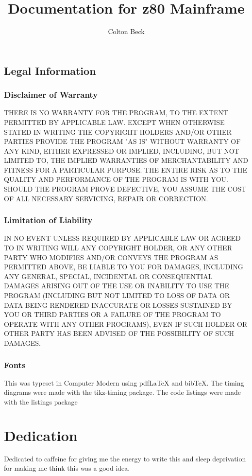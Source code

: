 \documentclass{book}
\begin{document}
\frontmatter
\title{Documentation for z80 Mainframe}
\author{Colton Beck}
\maketitle
\section*{Legal Information}
\subsection*{Disclaimer of Warranty}

  THERE IS NO WARRANTY FOR THE PROGRAM, TO THE EXTENT PERMITTED BY
APPLICABLE LAW.  EXCEPT WHEN OTHERWISE STATED IN WRITING THE COPYRIGHT
HOLDERS AND/OR OTHER PARTIES PROVIDE THE PROGRAM "AS IS" WITHOUT WARRANTY
OF ANY KIND, EITHER EXPRESSED OR IMPLIED, INCLUDING, BUT NOT LIMITED TO,
THE IMPLIED WARRANTIES OF MERCHANTABILITY AND FITNESS FOR A PARTICULAR
PURPOSE.  THE ENTIRE RISK AS TO THE QUALITY AND PERFORMANCE OF THE PROGRAM
IS WITH YOU.  SHOULD THE PROGRAM PROVE DEFECTIVE, YOU ASSUME THE COST OF
ALL NECESSARY SERVICING, REPAIR OR CORRECTION.

\subsection*{Limitation of Liability}

  IN NO EVENT UNLESS REQUIRED BY APPLICABLE LAW OR AGREED TO IN WRITING
WILL ANY COPYRIGHT HOLDER, OR ANY OTHER PARTY WHO MODIFIES AND/OR CONVEYS
THE PROGRAM AS PERMITTED ABOVE, BE LIABLE TO YOU FOR DAMAGES, INCLUDING ANY
GENERAL, SPECIAL, INCIDENTAL OR CONSEQUENTIAL DAMAGES ARISING OUT OF THE
USE OR INABILITY TO USE THE PROGRAM (INCLUDING BUT NOT LIMITED TO LOSS OF
DATA OR DATA BEING RENDERED INACCURATE OR LOSSES SUSTAINED BY YOU OR THIRD
PARTIES OR A FAILURE OF THE PROGRAM TO OPERATE WITH ANY OTHER PROGRAMS),
EVEN IF SUCH HOLDER OR OTHER PARTY HAS BEEN ADVISED OF THE POSSIBILITY OF
SUCH DAMAGES.
\subsection*{Fonts}
This was typeset in Computer Modern using pdf\LaTeX{} and bib\TeX{}.
The timing diagrams were made with the tikz-timing package.
The code listings were made with the listings package
\chapter*{Dedication}
Dedicated to caffeine for giving me the energy to write this and sleep deprivation for making me think this was a good idea.
\tableofcontents
\listoffigures
\listoftables
\mainmatter
\end{document}
